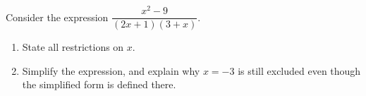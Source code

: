 Consider the expression $\dfrac{x^2-9}{(2x+1)(3+x)}$.
\begin{enumerate}
\item[(a)] State all restrictions on $x$.
\item[(b)] Simplify the expression, and explain why $x=-3$ is still excluded even though the simplified form is defined there.
\end{enumerate}
